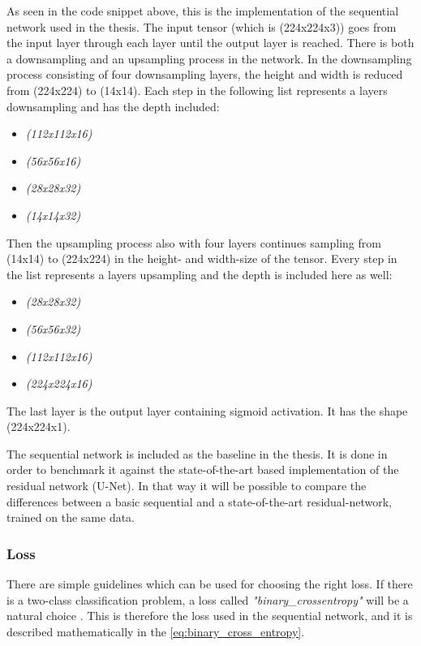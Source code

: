 \documentclass[USenglish]{ifimaster}  %
\begin{document}
As seen in the code snippet above, this is the implementation of the sequential network used in the thesis. The input tensor (which is (224x224x3)) goes from the input layer through each layer until the output layer is reached. 
There is both a downsampling and an upsampling process in the network. In the downsampling process consisting of four downsampling layers, the height and width is reduced from (224x224) to (14x14). Each step in the following list represents a layers downsampling and has the depth included:
\begin{itemize}
    \item \textit{(112x112x16)}
    \item \textit{(56x56x16)}
    \item \textit{(28x28x32)}
    \item \textit{(14x14x32)}
\end{itemize}
Then the upsampling process also with four layers continues sampling from (14x14) to (224x224) in the height- and width-size of the tensor. Every step in the list represents a layers upsampling and the depth is included here as well:
\begin{itemize}
    \item \textit{(28x28x32)}
    \item \textit{(56x56x32)}
    \item \textit{(112x112x16)}
    \item \textit{(224x224x16)}
\end{itemize}
The last layer is the output layer containing sigmoid activation. It has the shape (224x224x1).

The sequential network is included as the baseline in the thesis. It is done in order to benchmark it against the state-of-the-art based implementation of the residual network (U-Net). In that way it will be possible to compare the differences between a basic sequential and a state-of-the-art residual-network, trained on the same data.
\subsubsection{Loss}
There are simple guidelines which can be used for choosing the right loss. If there is a two-class classification problem, a loss called \textit{"binary\_crossentropy"} will be a natural choice \cite{Francois_Deep_learning_with_python}. This is therefore the loss used in the sequential network, and it is described mathematically in the \cref{eq:binary_cross_entropy}.
\end{document}
